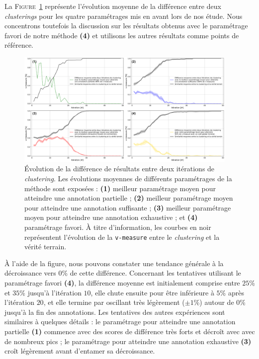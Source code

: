 			La \textsc{Figure~\ref{figure:4.5.2-ETUDE-RENTABILITE-SIMILARITE-CLUSTERING}} représente l'évolution moyenne de la différence entre deux \textit{clusterings} pour les quatre paramétrages mis en avant lors de nos étude.
			Nous concentrons toutefois la discussion sur les résultats obtenus avec le paramétrage favori de notre méthode \textbf{(4)} et utilisons les autres résultats comme points de référence.
			\begin{figure}[!htb]
				\centering
				\includegraphics[width=0.95\textwidth]{figures/etude-rentabilite-similarite-clustering}
				\caption{Évolution de la différence de résultats entre deux itérations de \textit{clustering}.
				Les évolutions moyennes de différents paramétrages de la méthode sont exposées :
				\textbf{(1)} meilleur paramétrage moyen pour atteindre une annotation partielle ;
				\textbf{(2)} meilleur paramétrage moyen pour atteindre une annotation suffisante ;
				\textbf{(3)} meilleur paramétrage moyen pour atteindre une annotation exhaustive ;
				et \textbf{(4)} paramétrage favori.
				À titre d'information, les courbes en noir représentent l'évolution de la \texttt{v-measure} entre le \textit{clustering} et la vérité terrain.
				}
				\label{figure:4.5.2-ETUDE-RENTABILITE-SIMILARITE-CLUSTERING}
			\end{figure}
			
			À l'aide de la figure, nous pouvons constater une tendance générale à la décroissance vers $0$\% de cette différence.
			Concernant les tentatives utilisant le paramétrage favori \textbf{(4)}, la différence moyenne est initialement comprise entre $25$\% et $35$\% jusqu'à l'itération $10$, elle chute ensuite pour être inférieure à $5$\% après l'itération $20$, et elle termine par oscillant très légèrement ($\pm1$\%) autour de $0$\% jusqu'à la fin des annotations.
			Les tentatives des autres expériences sont similaires à quelques détails : le paramétrage pour atteindre une annotation partielle \textbf{(1)} commence avec des scores de différence très forts et décroît avec avec de nombreux pics ; le paramétrage pour atteindre une annotation exhaustive \textbf{(3)} croît légèrement avant d'entamer sa décroissance.
			
